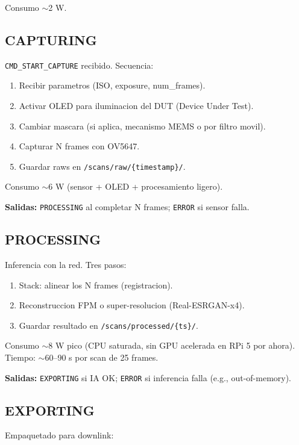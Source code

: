 \documentclass[11pt,a4paper,oneside,openright]{book}
\begin{document}
Consumo $\sim$2 W.

\subsection*{CAPTURING}

\texttt{CMD\_START\_CAPTURE} recibido. Secuencia:

\begin{enumerate}[leftmargin=2em]
  \item Recibir parametros (ISO, exposure, num\_frames).
  \item Activar OLED para iluminacion del DUT (Device Under Test).
  \item Cambiar mascara (si aplica, mecanismo MEMS o por filtro
    movil).
  \item Capturar N frames con OV5647.
  \item Guardar raws en \texttt{/scans/raw/\{timestamp\}/}.
\end{enumerate}

Consumo $\sim$6 W (sensor + OLED + procesamiento ligero).

\textbf{Salidas:} \texttt{PROCESSING} al completar N frames;
\texttt{ERROR} si sensor falla.

\subsection*{PROCESSING}

Inferencia con la red. Tres pasos:

\begin{enumerate}[leftmargin=2em]
  \item Stack: alinear los N frames (registracion).
  \item Reconstruccion FPM o super-resolucion (Real-ESRGAN-x4).
  \item Guardar resultado en \texttt{/scans/processed/\{ts\}/}.
\end{enumerate}

Consumo $\sim$8 W pico (CPU saturada, sin GPU acelerada en RPi 5
por ahora). Tiempo: $\sim$60--90 s por scan de 25 frames.

\textbf{Salidas:} \texttt{EXPORTING} si IA OK; \texttt{ERROR} si
inferencia falla (e.g., out-of-memory).

\subsection*{EXPORTING}

Empaquetado para downlink:
\end{document}

